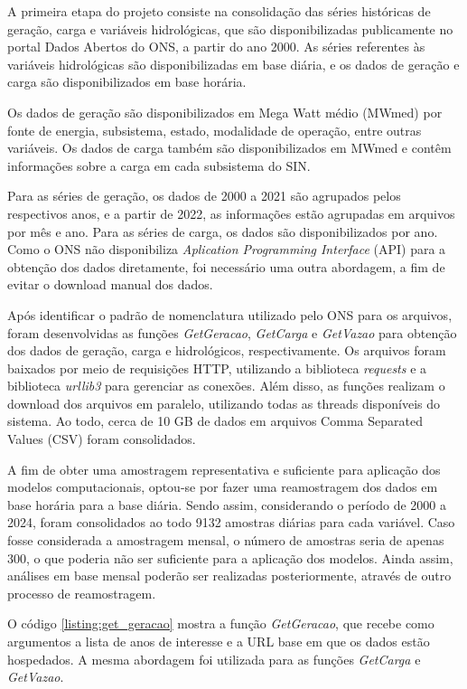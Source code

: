 A primeira etapa do projeto consiste na consolidação das séries históricas de geração, carga e variáveis hidrológicas,
que são disponibilizadas publicamente no portal Dados Abertos do ONS, a partir do ano 2000. As séries referentes 
às variáveis hidrológicas são disponibilizadas em base diária, e os dados de geração e carga são disponibilizados em 
base horária.

Os dados de geração são disponibilizados em Mega Watt médio (MWmed) por fonte de energia, subsistema, estado, 
modalidade de operação, entre outras variáveis. Os dados de carga também são disponibilizados em MWmed e contêm 
informações sobre a carga em cada subsistema do SIN.

Para as séries de geração, os dados de 2000 a 2021 são agrupados pelos respectivos anos, e a partir de 2022,
as informações estão agrupadas em arquivos por mês e ano. Para as séries de carga, os dados são disponibilizados por
ano. Como o ONS não disponibiliza \textit{Aplication Programming Interface} (API) para a obtenção dos dados diretamente, foi 
necessário uma outra abordagem, a fim de evitar o download manual dos dados. 

Após identificar o padrão de nomenclatura utilizado pelo ONS para os arquivos, foram desenvolvidas as funções 
\textit{GetGeracao}, \textit{GetCarga} e \textit{GetVazao} para obtenção dos dados de geração, carga e hidrológicos,
respectivamente. Os arquivos foram baixados por meio de requisições HTTP, utilizando a biblioteca \textit{requests} e
a biblioteca \textit{urllib3} para gerenciar as conexões. Além disso, as funções realizam o download dos arquivos em
paralelo, utilizando todas as threads disponíveis do sistema. Ao todo, cerca de 10 GB de dados em arquivos Comma 
Separated Values (CSV) foram consolidados.

A fim de obter uma amostragem representativa e suficiente para aplicação dos modelos computacionais, optou-se por 
fazer uma reamostragem dos dados em base horária para a base diária. Sendo assim, considerando o período de 2000 
a 2024, foram consolidados ao todo 9132 amostras diárias para cada variável. Caso fosse considerada a amostragem mensal,
o número de amostras seria de apenas 300, o que poderia não ser suficiente para a aplicação dos modelos. Ainda assim, 
análises em base mensal poderão ser realizadas posteriormente, através de outro processo de reamostragem.

O código \ref{listing:get_geracao} mostra a função \textit{GetGeracao}, que recebe como argumentos a lista de
anos de interesse e a URL base em que os dados estão hospedados. A mesma abordagem foi utilizada para as funções
\textit{GetCarga} e \textit{GetVazao}.

